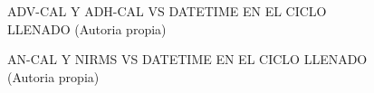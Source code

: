 \begin{figure}[H]
  \hfill
  \hfill
  \hfill
  \caption{ADV-CAL Y ADH-CAL VS DATETIME EN EL CICLO LLENADO (Autoria propia)}
  \end{figure}
\begin{figure}[H]
  \hfill
  \hfill
  \hfill
  \caption{AN-CAL Y NIRMS VS DATETIME EN EL CICLO LLENADO (Autoria propia)}
  \end{figure}
